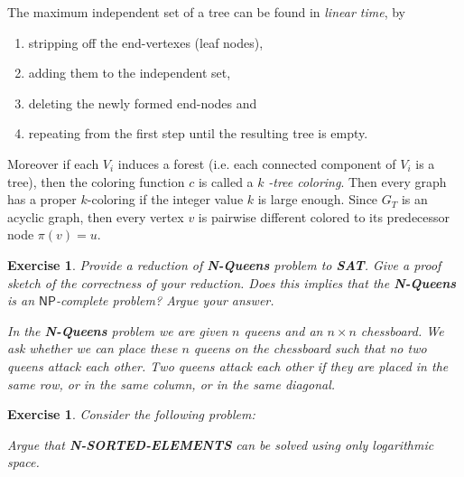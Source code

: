 \documentclass[11pt]{article}
\newtheorem{exercise}[theorem]{Exercise}
\begin{document}
The maximum independent set of a tree can be found in \textit{linear time},
by
\begin{enumerate}
\item[(1)] stripping off the end-vertexes (leaf nodes),
\item[(2)] adding them to the independent set,
\item[(3)] deleting the newly formed end-nodes and
\item[(4)] repeating from the first step until the resulting tree is empty.
\end{enumerate}
Moreover if each $V_{i}$ induces a forest (i.e. each connected component of $%
V_{i}$ is a tree), then the coloring function $c$ is called a $k$\textit{%
-tree coloring}. Then every graph has a proper $k$-coloring if the integer
value $k$ is large enough. Since $G_{T}$ is an acyclic graph, then every
vertex $v$ is pairwise different colored to its predecessor node $\pi (v)=u$.

\bigskip

\begin{exercise}
\label{ex:Nqueens} Provide a reduction of \textbf{N-Queens} problem to 
\textbf{SAT}. Give a proof sketch of the correctness of your reduction. Does
this implies that the \textbf{N-Queens} is an $\mathsf{NP}$-complete
problem? Argue your answer.

\smallskip

\noindent In the \textbf{N-Queens} problem we are given $n$ queens and an $n
\times n$ chessboard. We ask whether we can place these $n$ queens on the
chessboard such that no two queens attack each other. Two queens attack each
other if they are placed in the same row, or in the same column, or in the
same diagonal.
\end{exercise}

\begin{exercise}
Consider the following problem:


\medskip Argue that \textbf{N-SORTED-ELEMENTS} can be solved using only
logarithmic space.
\end{exercise}
\end{document}
